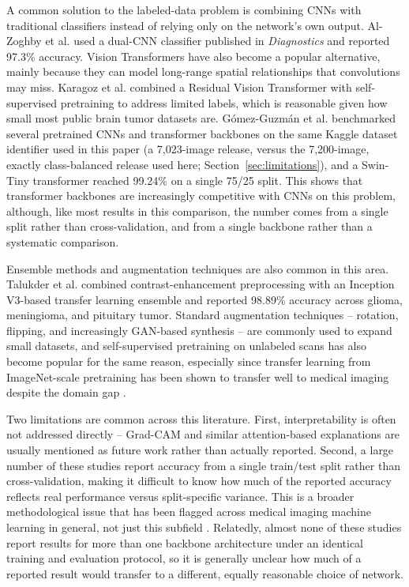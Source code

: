 \documentclass[11pt]{article}
\begin{document}
A common solution to the labeled-data problem is combining CNNs with traditional classifiers instead of relying only on the network's own output. Al-Zoghby et al. \cite{r18} used a dual-CNN classifier published in \emph{Diagnostics} and reported 97.3\% accuracy. Vision Transformers \cite{dosovitskiy2021vit} have also become a popular alternative, mainly because they can model long-range spatial relationships that convolutions may miss. Karagoz et al. \cite{r19} combined a Residual Vision Transformer with self-supervised pretraining to address limited labels, which is reasonable given how small most public brain tumor datasets are. G\'omez-Guzm\'an et al. \cite{gomezguzman2025swin} benchmarked several pretrained CNNs and transformer backbones on the same Kaggle dataset identifier used in this paper (a 7,023-image release, versus the 7,200-image, exactly class-balanced release used here; Section~\ref{sec:limitations}), and a Swin-Tiny transformer reached 99.24\% on a single 75/25 split. This shows that transformer backbones are increasingly competitive with CNNs on this problem, although, like most results in this comparison, the number comes from a single split rather than cross-validation, and from a single backbone rather than a systematic comparison.

Ensemble methods and augmentation techniques are also common in this area. Talukder et al. \cite{r20} combined contrast-enhancement preprocessing with an Inception V3-based transfer learning ensemble and reported 98.89\% accuracy across glioma, meningioma, and pituitary tumor. Standard augmentation techniques -- rotation, flipping, and increasingly GAN-based synthesis \cite{goodfellow2014gan} -- are commonly used to expand small datasets, and self-supervised pretraining on unlabeled scans has also become popular for the same reason, especially since transfer learning from ImageNet-scale pretraining has been shown to transfer well to medical imaging despite the domain gap \cite{morid2021transfer}.

Two limitations are common across this literature. First, interpretability is often not addressed directly -- Grad-CAM and similar attention-based explanations are usually mentioned as future work rather than actually reported. Second, a large number of these studies report accuracy from a single train/test split rather than cross-validation, making it difficult to know how much of the reported accuracy reflects real performance versus split-specific variance. This is a broader methodological issue that has been flagged across medical imaging machine learning in general, not just this subfield \cite{varoquaux2022leakage}. Relatedly, almost none of these studies report results for more than one backbone architecture under an identical training and evaluation protocol, so it is generally unclear how much of a reported result would transfer to a different, equally reasonable choice of network.
\end{document}
